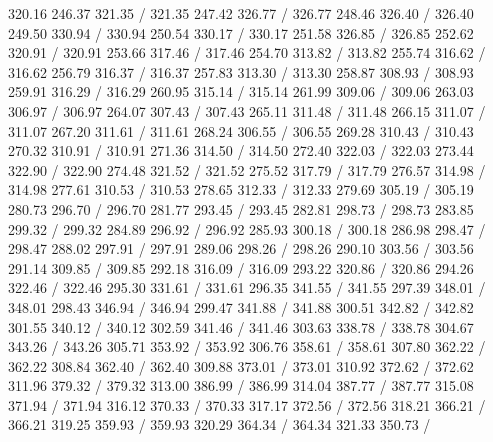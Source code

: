 { 320.16 246.37 321.35 /
 321.35 247.42 326.77 /
 326.77 248.46 326.40 /
 326.40 249.50 330.94 /
 330.94 250.54 330.17 /
 330.17 251.58 326.85 /
 326.85 252.62 320.91 /
 320.91 253.66 317.46 /
 317.46 254.70 313.82 /
 313.82 255.74 316.62 /
 316.62 256.79 316.37 /
 316.37 257.83 313.30 /
 313.30 258.87 308.93 /
 308.93 259.91 316.29 /
 316.29 260.95 315.14 /
 315.14 261.99 309.06 /
 309.06 263.03 306.97 /
 306.97 264.07 307.43 /
 307.43 265.11 311.48 /
 311.48 266.15 311.07 /
 311.07 267.20 311.61 /
 311.61 268.24 306.55 /
 306.55 269.28 310.43 /
 310.43 270.32 310.91 /
 310.91 271.36 314.50 /
 314.50 272.40 322.03 /
 322.03 273.44 322.90 /
 322.90 274.48 321.52 /
 321.52 275.52 317.79 /
 317.79 276.57 314.98 /
 314.98 277.61 310.53 /
 310.53 278.65 312.33 /
 312.33 279.69 305.19 /
 305.19 280.73 296.70 /
 296.70 281.77 293.45 /
 293.45 282.81 298.73 /
 298.73 283.85 299.32 /
 299.32 284.89 296.92 /
 296.92 285.93 300.18 /
 300.18 286.98 298.47 /
 298.47 288.02 297.91 /
 297.91 289.06 298.26 /
 298.26 290.10 303.56 /
 303.56 291.14 309.85 /
 309.85 292.18 316.09 /
 316.09 293.22 320.86 /
 320.86 294.26 322.46 /
 322.46 295.30 331.61 /
 331.61 296.35 341.55 /
 341.55 297.39 348.01 /
 348.01 298.43 346.94 /
 346.94 299.47 341.88 /
 341.88 300.51 342.82 /
 342.82 301.55 340.12 /
 340.12 302.59 341.46 /
 341.46 303.63 338.78 /
 338.78 304.67 343.26 /
 343.26 305.71 353.92 /
 353.92 306.76 358.61 /
 358.61 307.80 362.22 /
 362.22 308.84 362.40 /
 362.40 309.88 373.01 /
 373.01 310.92 372.62 /
 372.62 311.96 379.32 /
 379.32 313.00 386.99 /
 386.99 314.04 387.77 /
 387.77 315.08 371.94 /
 371.94 316.12 370.33 /
 370.33 317.17 372.56 /
 372.56 318.21 366.21 /
 366.21 319.25 359.93 /
 359.93 320.29 364.34 /
 364.34 321.33 350.73 /
}
